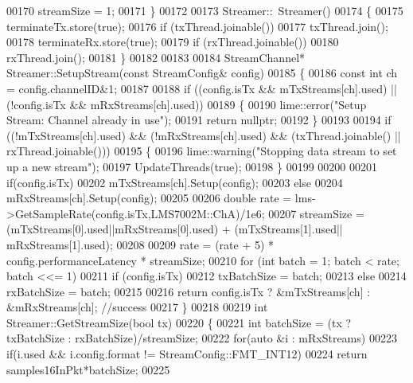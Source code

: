 \begin{DoxyCode}
00170     streamSize = 1;
00171 \}
00172 
00173 Streamer::~Streamer()
00174 \{
00175     terminateTx.store(\textcolor{keyword}{true});
00176     \textcolor{keywordflow}{if} (txThread.joinable())
00177         txThread.join();
00178     terminateRx.store(\textcolor{keyword}{true});
00179     \textcolor{keywordflow}{if} (rxThread.joinable())
00180         rxThread.join();
00181 \}
00182 
00183 
00184 StreamChannel* Streamer::SetupStream(\textcolor{keyword}{const} StreamConfig& config)
00185 \{
00186     \textcolor{keyword}{const} \textcolor{keywordtype}{int} ch = config.channelID&1;
00187 
00188     \textcolor{keywordflow}{if} ((config.isTx && mTxStreams[ch].used) || (!config.isTx && mRxStreams[ch].used))
00189     \{
00190         lime::error(\textcolor{stringliteral}{"Setup Stream: Channel already in use"});
00191         \textcolor{keywordflow}{return} \textcolor{keyword}{nullptr};
00192     \}
00193 
00194     \textcolor{keywordflow}{if} ((!mTxStreams[ch].used) && (!mRxStreams[ch].used) && (txThread.joinable() || 
      rxThread.joinable()))
00195     \{
00196         lime::warning(\textcolor{stringliteral}{"Stopping data stream to set up a new stream"});
00197         UpdateThreads(\textcolor{keyword}{true});
00198     \}
00199 
00200 
00201     \textcolor{keywordflow}{if}(config.isTx)
00202         mTxStreams[ch].Setup(config);
00203     \textcolor{keywordflow}{else}
00204         mRxStreams[ch].Setup(config);
00205 
00206     \textcolor{keywordtype}{double} rate = lms->GetSampleRate(config.isTx,LMS7002M::ChA)/1e6;
00207     streamSize = (mTxStreams[0].used||mRxStreams[0].used) + (mTxStreams[1].used||
      mRxStreams[1].used);
00208 
00209     rate = (rate + 5) * config.performanceLatency * streamSize;
00210     for (\textcolor{keywordtype}{int} batch = 1; batch < rate; batch <<= 1)
00211         \textcolor{keywordflow}{if} (config.isTx)
00212             txBatchSize = batch;
00213         \textcolor{keywordflow}{else}
00214             rxBatchSize = batch;
00215 
00216     \textcolor{keywordflow}{return} config.isTx ? &mTxStreams[ch] : &mRxStreams[ch]; \textcolor{comment}{//success}
00217 \}
00218 
00219 \textcolor{keywordtype}{int} Streamer::GetStreamSize(\textcolor{keywordtype}{bool} tx)
00220 \{
00221     \textcolor{keywordtype}{int} batchSize = (tx ? txBatchSize : rxBatchSize)/streamSize;
00222     \textcolor{keywordflow}{for}(\textcolor{keyword}{auto} &i : mRxStreams)
00223         \textcolor{keywordflow}{if}(i.used && i.config.format != StreamConfig::FMT_INT12)
00224             \textcolor{keywordflow}{return} samples16InPkt*batchSize;
00225 

\end{DoxyCode}
